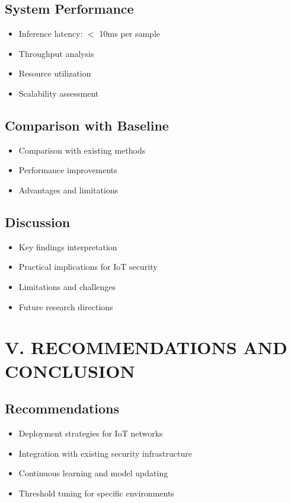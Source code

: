 \documentclass[conference]{IEEEtran}
\begin{document}
\subsection{System Performance}
\begin{itemize}
    \item Inference latency: $<$ 10ms per sample
    \item Throughput analysis
    \item Resource utilization
    \item Scalability assessment
\end{itemize}

\subsection{Comparison with Baseline}
\begin{itemize}
    \item Comparison with existing methods
    \item Performance improvements
    \item Advantages and limitations
\end{itemize}

\subsection{Discussion}
\begin{itemize}
    \item Key findings interpretation
    \item Practical implications for IoT security
    \item Limitations and challenges
    \item Future research directions
\end{itemize}

\section{V. RECOMMENDATIONS AND CONCLUSION}

\subsection{Recommendations}
\begin{itemize}
    \item Deployment strategies for IoT networks
    \item Integration with existing security infrastructure
    \item Continuous learning and model updating
    \item Threshold tuning for specific environments
\end{itemize}
\end{document}
